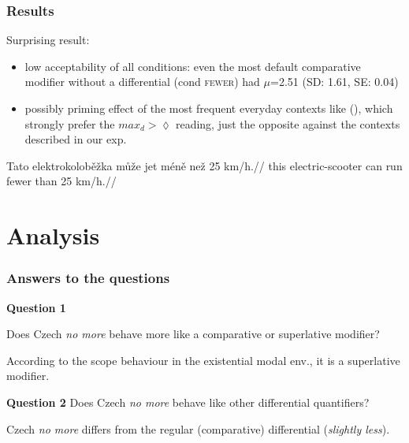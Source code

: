 \documentclass[10pt
]{beamer}
\newcommand{\cond}[1]{\textsc{#1}}
\begin{document}
\begin{frame}
  \frametitle{Results}

  Surprising result:
  
  \begin{itemize}
    \item low acceptability of all conditions: even the most default comparative modifier without a differential (cond \cond{fewer}) had $\mu$=2.51 (SD: 1.61, SE: 0.04)
    \item possibly priming effect of the most frequent everyday contexts like (\nextx), which strongly prefer the $max_d > \lozenge$ reading, just the opposite against the contexts described in our exp. 

  \end{itemize}

\ex 
\begingl
\gla Tato elektrokoloběžka může jet méně než 25 km/h.//
\glb this electric-scooter can run fewer than 25 km/h.//
\endgl
\xe

\end{frame}

\section{Analysis}


\begin{frame}
  \frametitle{Answers to the questions}

  \textbf{Question 1}

  \ex Does Czech \textit{no more} behave more like a comparative or superlative modifier?
  \xe

According to the scope behaviour in the existential modal env., it is a superlative modifier.


  \textbf{Question 2}
\ex Does Czech \textit{no more} behave like other differential quantifiers?
\xe


Czech \textit{no more} differs from the regular (comparative) differential (\textit{slightly less}).


  

\end{frame}
\end{document}
